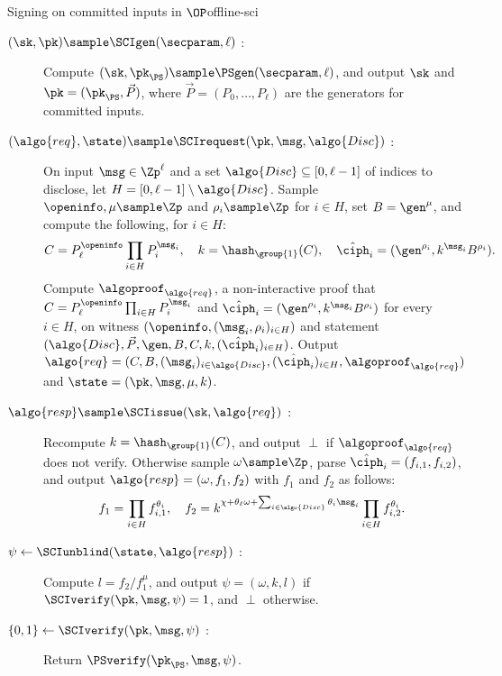 \begin{protocolbox}{Signing on committed inputs in $\OP$}{offline-sci}

  \begin{description}

    \item[$(\sk, \pk) \sample \SCIgen(\secparam, \ell)$ :] Compute $(\sk,
\pk_{\PS}) \sample \PSgen(\secparam, \ell)$, and output $\sk$ and $\pk =
(\pk_{\PS}, \vec{P})$, where $\vec{P} = (P_0, \ldots, P_\ell)$ are the
generators for committed inputs.

    \item[$(\algo{req}, \state) \sample \SCIrequest(\pk, \msg, \algo{Disc})$ :]
On input $\msg \in \Zp^{\ell}$ and a set $\algo{Disc} \subseteq [0, \ell-1]$ of
indices to disclose, let $H = [0, \ell-1] \setminus \algo{Disc}$. Sample $\openinfo,
\mu \sample \Zp$ and $\rho_i \sample \Zp$ for $i \in H$, set $B = \gen^{\mu}$, and
compute the following, for $i \in H$:
          \begin{equation*}
            C = P_\ell^{\openinfo} \prod_{i \in H} P_i^{\msg_i}, \quad k =
\hash_{\group{1}}(C), \quad \hat{\ciph}_i = (\gen^{\rho_i}, k^{\msg_i}
B^{\rho_i}).
          \end{equation*}
Compute $\algoproof_{\algo{req}}$, a non-interactive
proof that $C = P_\ell^{\openinfo} \prod_{i \in H} P_i^{\msg_i}$ and
$\hat{\ciph}_i = (\gen^{\rho_i}, k^{\msg_i} B^{\rho_i})$ for every $i \in H$, on
witness $(\openinfo, (\msg_i, \rho_i)_{i \in H})$ and statement $(\algo{Disc},
\vec{P}, \gen, B, C, k, (\hat{\ciph}_i)_{i \in H})$. Output $\algo{req} = (C,
B, (\msg_i)_{i \in \algo{Disc}}, (\hat{\ciph}_i)_{i \in H},
\algoproof_{\algo{req}})$ and $\state = (\pk, \msg, \mu, k)$.

    \item[$\algo{resp} \sample \SCIissue(\sk, \algo{req})$ :] Recompute $k =
\hash_{\group{1}}(C)$, and output $\perp$ if $\algoproof_{\algo{req}}$ does not
verify. Otherwise sample $\omega \sample \Zp$, parse $\hat{\ciph}_i = (f_{i,1},
f_{i,2})$, and output $\algo{resp} = (\omega, f_1, f_2)$ with $f_1$ and $f_2$
as follows:
          \begin{equation*}
            f_1 = \prod_{i \in H} f_{i,1}^{\theta_i}, \quad f_2 = k^{\chi +
\theta_\ell \omega + \sum_{i \in \algo{Disc}} \theta_i \msg_i} \prod_{i \in H}
f_{i,2}^{\theta_i}.
          \end{equation*}

    \item[$\psi \leftarrow \SCIunblind(\state, \algo{resp})$ :] Compute $l = f_2
/ f_1^{\mu}$, and output $\psi = (\omega, k, l)$ if $\SCIverify(\pk, \msg, \psi)
= 1$, and $\perp$ otherwise.

    \item[$\{0,1\} \leftarrow \SCIverify(\pk, \msg, \psi)$ :] Return
$\PSverify(\pk_{\PS}, \msg, \psi)$.

  \end{description}

\end{protocolbox}

